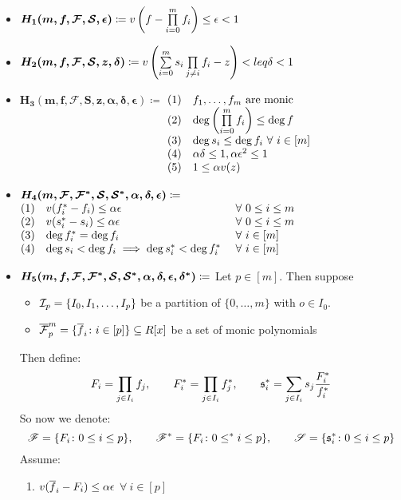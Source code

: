 \begin{itemize}
	\item $\boldsymbol{H_1(m,f,\mathcal{F},\mathcal{S},\epsilon)}\coloneqq v\left(f-\prod\limits_{i=0}^mf_i\right)\leq\epsilon<1$ 
	\item $\boldsymbol{H_2(m,f,\mathcal{F},\mathcal{S},z,\delta)}\coloneqq v\left(\sum\limits_{i=0}^m s_i\prod\limits_{j\neq i}f_i -z   \right)<leq \delta<1$
	\item $\boldsymbol{H_3(m,f,\mathcal{F},S,z,\alpha,\delta,\epsilon)}\coloneqq$ 
	$\begin{array}[t]{@{}rl@{}}
		(1) &f_1,\dots,f_m \text{ are monic}\\
		(2) &\deg\left(\prod\limits_{i=0}^mf_i\right)\leq \deg f\\
		(3) &\deg s_i\leq \deg f_i \ \forall\  i\in[m]\\
		(4) &\alpha\delta\leq 1, \alpha\epsilon^2\leq 1\\
		(5) &1\leq \alpha v(z)
	\end{array}$
	\item $\boldsymbol{H_4(m,\mathcal{F},\mathcal{F}^*,\mathcal{S},\mathcal{S}^*,\alpha,\delta,\epsilon)}\coloneqq$ $\begin{array}[t]{@{}rll@{}}
		(1) & v(f^*_i-f_i)\leq \alpha\eps\ &\forall\ 0\leq i\leq m\\
		(2) & v(s^*_i-s_i)\leq \alpha\eps\ &\forall\ 0\leq i\leq m\\
		(3) &\deg f_i^*= \deg f_i\ &\forall \ i\in[m]\\
		(4) &\deg s_i<\deg f_i\implies \deg s_i^*<\deg f_i^*\ &\forall\ i\in [m]
	\end{array}$
	\item $\boldsymbol{H_5(m,f,\mathcal{F},\mathcal{F}^*,\mathcal{S},\mathcal{S}^*, \alpha,\delta,\epsilon,\delta^*)}\coloneqq $ Let $p\in[m]$. Then suppose
	\begin{itemize}
		\item $\mathcal{I}_p=\{I_0,I_1,\dots,I_p\}$ be a partition of $\{0,\dots,m\}$ with $o\in I_0$. 
		\item $\overline{\mathcal{F}}_p^m=\{\overline{f}_i\colon i\in[p]\}\subseteq R[x]$ be a set of monic polynomials
	\end{itemize}
	Then define: $$F_i=\prod_{j\in I_i} f_j,\qquad F_i^*=\prod_{j\in I_i}f_j^*,\qquad \mathfrak{s}_i^*=\sum_{j\in I_i} s_j\frac{F_i^*}{f_i^*}$$So now we denote:$${\mathscr{F}}=\{F_i\colon 0\leq i\leq p\},\qquad {\mathscr{F}}^*=\{F_i\colon 0\leq^* i\leq p\}, \qquad {\mathscr{S}}=\{\mathfrak{s}_i^*\colon 0\leq i\leq p\} $$
	Assume:\begin{enumerate}
		\item $v(\overline{f}_i-F_i)\leq \alpha \epsilon $ $\forall \ i\in[p]$

\end{enumerate}
\end{itemize}

